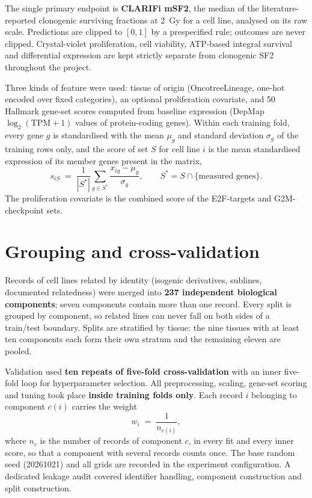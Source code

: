 The single primary endpoint is \textbf{CLARIFi mSF2}, the median of the literature-reported
clonogenic surviving fractions at 2~Gy for a cell line, analysed on its raw scale.
Predictions are clipped to $[0,1]$ by a prespecified rule; outcomes are never clipped.
Crystal-violet proliferation, cell viability, ATP-based integral survival and differential
expression are kept strictly separate from clonogenic SF2 throughout the project.

Three kinds of feature were used: tissue of origin (OncotreeLineage, one-hot encoded over
fixed categories), an optional proliferation covariate, and 50 Hallmark gene-set scores
computed from baseline expression (DepMap $\log_2(\mathrm{TPM}+1)$ values of protein-coding
genes). Within each training fold, every gene $g$ is standardised with the mean $\mu_g$ and
standard deviation $\sigma_g$ of the training rows only, and the score of set $S$ for cell
line $i$ is the mean standardised expression of its member genes present in the matrix,
\begin{equation}
  s_{iS} \;=\; \frac{1}{|S^{\ast}|}\sum_{g\in S^{\ast}} \frac{x_{ig}-\mu_g}{\sigma_g},
  \qquad S^{\ast} = S \cap \{\text{measured genes}\}.
  \label{eq:score}
\end{equation}
The proliferation covariate is the combined score of the E2F-targets and G2M-checkpoint
sets.

\section{Grouping and cross-validation}\label{sec:cv}

Records of cell lines related by identity (isogenic derivatives, sublines, documented
relatedness) were merged into \textbf{237 independent biological components}; seven
components contain more than one record. Every split is grouped by component, so related
lines can never fall on both sides of a train/test boundary. Splits are stratified by
tissue: the nine tissues with at least ten components each form their own stratum and the
remaining eleven are pooled.

Validation used \textbf{ten repeats of five-fold cross-validation} with an inner five-fold
loop for hyperparameter selection. All preprocessing, scaling, gene-set scoring and tuning
took place \textbf{inside training folds only}. Each record $i$ belonging to component
$c(i)$ carries the weight
\begin{equation}
  w_i \;=\; \frac{1}{n_{c(i)}},
  \label{eq:weights}
\end{equation}
where $n_c$ is the number of records of component $c$, in every fit and every inner score,
so that a component with several records counts once. The base random seed (20261021) and
all grids are recorded in the experiment configuration. A dedicated leakage audit covered
identifier handling, component construction and split construction.

